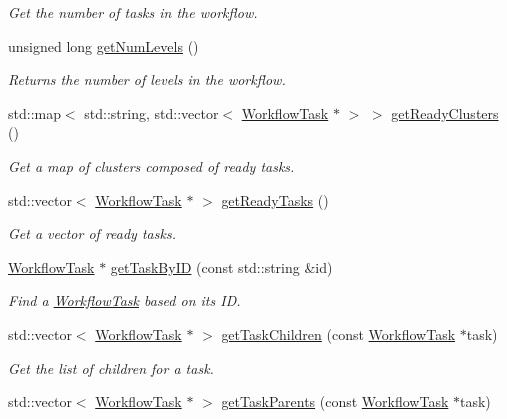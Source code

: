 \begin{DoxyCompactItemize}
\begin{DoxyCompactList}\small\item\em Get the number of tasks in the workflow. \end{DoxyCompactList}\item 
unsigned long \hyperlink{classwrench_1_1_workflow_a15f12b7d5088e8e1e2130545c2b795ea}{get\+Num\+Levels} ()
\begin{DoxyCompactList}\small\item\em Returns the number of levels in the workflow. \end{DoxyCompactList}\item 
std\+::map$<$ std\+::string, std\+::vector$<$ \hyperlink{classwrench_1_1_workflow_task}{Workflow\+Task} $\ast$ $>$ $>$ \hyperlink{classwrench_1_1_workflow_a875d3d3a26eba6316e249169814b853f}{get\+Ready\+Clusters} ()
\begin{DoxyCompactList}\small\item\em Get a map of clusters composed of ready tasks. \end{DoxyCompactList}\item 
std\+::vector$<$ \hyperlink{classwrench_1_1_workflow_task}{Workflow\+Task} $\ast$ $>$ \hyperlink{classwrench_1_1_workflow_a4834ec73e7a707338bad20d1da8a69ed}{get\+Ready\+Tasks} ()
\begin{DoxyCompactList}\small\item\em Get a vector of ready tasks. \end{DoxyCompactList}\item 
\hyperlink{classwrench_1_1_workflow_task}{Workflow\+Task} $\ast$ \hyperlink{classwrench_1_1_workflow_a43d89af79196164d060115ee25200306}{get\+Task\+By\+ID} (const std\+::string \&id)
\begin{DoxyCompactList}\small\item\em Find a \hyperlink{classwrench_1_1_workflow_task}{Workflow\+Task} based on its ID. \end{DoxyCompactList}\item 
std\+::vector$<$ \hyperlink{classwrench_1_1_workflow_task}{Workflow\+Task} $\ast$ $>$ \hyperlink{classwrench_1_1_workflow_a41bac6171a8698b355ffc90f0746d2fd}{get\+Task\+Children} (const \hyperlink{classwrench_1_1_workflow_task}{Workflow\+Task} $\ast$task)
\begin{DoxyCompactList}\small\item\em Get the list of children for a task. \end{DoxyCompactList}\item 
std\+::vector$<$ \hyperlink{classwrench_1_1_workflow_task}{Workflow\+Task} $\ast$ $>$ \hyperlink{classwrench_1_1_workflow_af1e29741cd98e691cd2aba0038453176}{get\+Task\+Parents} (const \hyperlink{classwrench_1_1_workflow_task}{Workflow\+Task} $\ast$task)

\end{DoxyCompactItemize}
